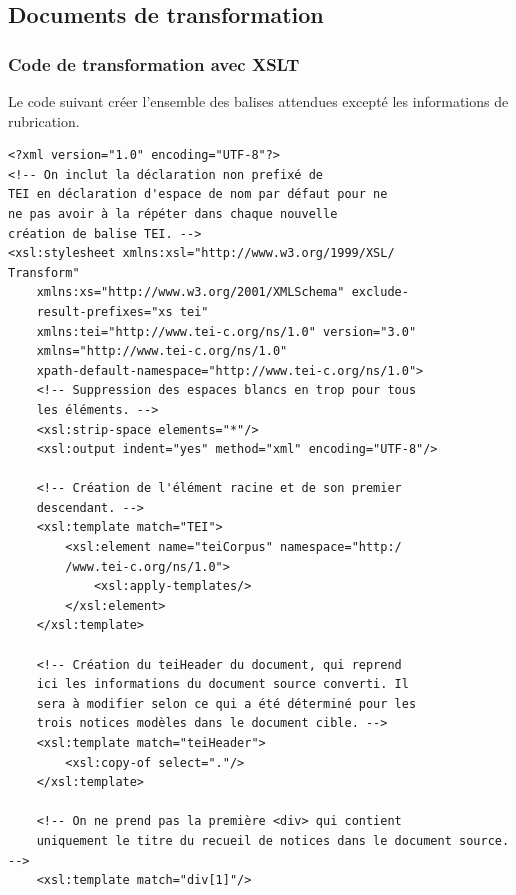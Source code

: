 \documentclass[a4paper,12pt,twoside]{book}
\begin{document}
	\subsection{Documents de transformation}
	
	\subsubsection{\label{code_XSLT}Code de transformation avec XSLT}
	
	Le code suivant créer l'ensemble des balises attendues excepté les informations de rubrication. 
	
	\begin{verbatim}
<?xml version="1.0" encoding="UTF-8"?>
<!-- On inclut la déclaration non prefixé de 
TEI en déclaration d'espace de nom par défaut pour ne 
ne pas avoir à la répéter dans chaque nouvelle
création de balise TEI. -->
<xsl:stylesheet xmlns:xsl="http://www.w3.org/1999/XSL/
Transform"
    xmlns:xs="http://www.w3.org/2001/XMLSchema" exclude-
    result-prefixes="xs tei" 
    xmlns:tei="http://www.tei-c.org/ns/1.0" version="3.0"
    xmlns="http://www.tei-c.org/ns/1.0"
    xpath-default-namespace="http://www.tei-c.org/ns/1.0">
    <!-- Suppression des espaces blancs en trop pour tous 
    les éléments. -->
    <xsl:strip-space elements="*"/>
    <xsl:output indent="yes" method="xml" encoding="UTF-8"/>
    
    <!-- Création de l'élément racine et de son premier 
    descendant. -->
    <xsl:template match="TEI">
        <xsl:element name="teiCorpus" namespace="http:/
        /www.tei-c.org/ns/1.0">
            <xsl:apply-templates/>
        </xsl:element>
    </xsl:template>
    
    <!-- Création du teiHeader du document, qui reprend 
    ici les informations du document source converti. Il 
    sera à modifier selon ce qui a été déterminé pour les 
    trois notices modèles dans le document cible. -->
    <xsl:template match="teiHeader">
        <xsl:copy-of select="."/>
    </xsl:template>
    
    <!-- On ne prend pas la première <div> qui contient 
    uniquement le titre du recueil de notices dans le document source.  -->
    <xsl:template match="div[1]"/>
    

\end{verbatim}
\end{document}

